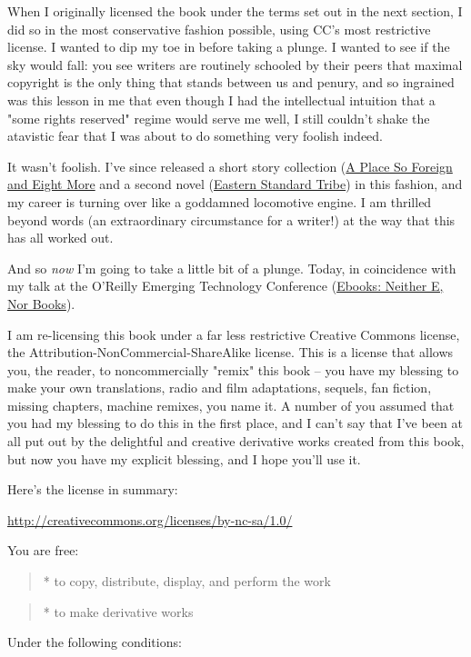 When I originally licensed the book under the terms set out in the
next section, I did so in the most conservative fashion possible,
using CC's most restrictive license. I wanted to dip my toe in
before taking a plunge. I wanted to see if the sky would fall: you
see writers are routinely schooled by their peers that maximal
copyright is the only thing that stands between us and penury, and
so ingrained was this lesson in me that even though I had the
intellectual intuition that a "some rights reserved" regime would
serve me well, I still couldn't shake the atavistic fear that I was
about to do something very foolish indeed.

It wasn't foolish. I've since released a short story collection
(\href{http://craphound.com/place}{A Place So Foreign and Eight More}
and a second novel
(\href{http://craphound.com/est}{Eastern Standard Tribe}) in this
fashion, and my career is turning over like a goddamned locomotive
engine. I am thrilled beyond words (an extraordinary circumstance
for a writer!) at the way that this has all worked out.

And so \emph{now} I'm going to take a little bit of a plunge.
Today, in coincidence with my talk at the O'Reilly Emerging
Technology Conference
(\href{http://conferences.oreillynet.com/cs/et2004/view/e_sess/4693}{Ebooks: Neither E, Nor Books}).

I am re-licensing this book under a far less restrictive Creative
Commons license, the Attribution-NonCommercial-ShareAlike license.
This is a license that allows you, the reader, to noncommercially
"remix" this book -- you have my blessing to make your own
translations, radio and film adaptations, sequels, fan fiction,
missing chapters, machine remixes, you name it. A number of you
assumed that you had my blessing to do this in the first place, and
I can't say that I've been at all put out by the delightful and
creative derivative works created from this book, but now you have
my explicit blessing, and I hope you'll use it.

Here's the license in summary:

\href{http://creativecommons.org/licenses/by-nc-sa/1.0/}{http://creativecommons.org/licenses/by-nc-sa/1.0/}

You are free:

\begin{quote}
* to copy, distribute, display, and perform the work
\end{quote}
\begin{quote}
* to make derivative works
\end{quote}
Under the following conditions:

